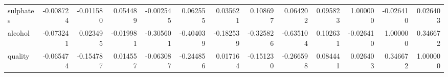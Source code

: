 \begin{tabular}{lrrrrrrrrrrrr}
sulphates            &      -0.008724 &         -0.011580 &     0.054489 &       -0.002545 &   0.062555 &             0.035621 &              0.108697 &  0.064202 &  0.095823 &   1.000000 & -0.026410 &  0.026403 \\
alcohol              &      -0.073241 &          0.023495 &    -0.019981 &       -0.305601 &  -0.404039 &            -0.182539 &             -0.325826 & -0.635104 &  0.102631 &  -0.026410 &  1.000000 &  0.346672 \\
quality              &      -0.065474 &         -0.154787 &     0.014557 &       -0.063087 &  -0.244856 &             0.017164 &             -0.151230 & -0.266598 &  0.084441 &   0.026403 &  0.346672 &  1.000000 \\
\bottomrule
\end{tabular}
